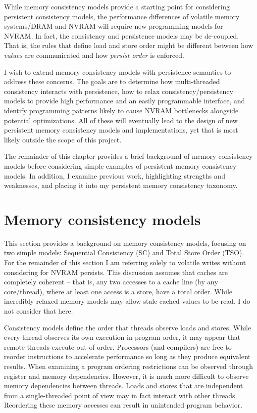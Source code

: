 While memory consistency models provide a starting point for considering persistent consistency models, the performance differences of volatile memory systems/DRAM and NVRAM will require new programming models for NVRAM.
In fact, the consistency and persistence models may be de-coupled.
That is, the rules that define load and store order might be different between how \emph{values} are communicated and how \emph{persist order} is enforced.

I wish to extend memory consistency models with persistence semantics to address these concerns.
The goals are to determine how multi-threaded consistency interacts with persistence, how to relax consistency/persistency models to provide high performance and an easily programmable interface, and identify programming patterns likely to cause NVRAM bottlenecks alongside potential optimizations.
All of these will eventually lead to the design of new persistent memory consistency models and implementations, yet that is most likely outside the scope of this project.

The remainder of this chapter provides a brief background of memory consistency models before considering simple examples of persistent memory consistency models.
In addition, I examine previous work, highlighting strengths and weaknesses, and placing it into my persistent memory consistency taxonomy.

\section{Memory consistency models}
\label{sec:PMC:MemoryConsistency}

This section provides a background on memory consistency models, focusing on two simple models: Sequential Consistency (SC) and Total Store Order (TSO).
For the remainder of this section I am referring solely to volatile writes without considering for NVRAM persists.
This discussion assumes that caches are completely coherent -- that is, any two accesses to a cache line (by any core/thread), where at least one access is a store, have a total order.
While incredibly relaxed memory models may allow stale cached values to be read, I do not consider that here.

Consistency models define the order that threads observe loads and stores.
While every thread observes its own execution in program order, it may appear that remote threads execute out of order.
Processors (and compilers) are free to reorder instructions to accelerate performance so long as they produce equivalent results.
When examining a program ordering restrictions can be observed through register and memory dependencies.
However, it is much more difficult to observe memory dependencies between threads.
Loads and stores that are independent from a single-threaded point of view may in fact interact with other threads.
Reordering these memory accesses can result in unintended program behavior.


